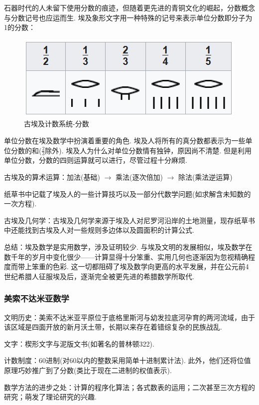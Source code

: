 \documentclass{Math_Note}
\begin{document}
石器时代的人未留下使用分数的痕迹，但随着更先进的青铜文化的崛起，分数概念与分数记号也应运而生.
埃及象形文字用一种特殊的记号来表示单位分数即分子为1的分数：

\begin{figure}[H]
    \centering
    \includegraphics[scale=0.8]{"./Figures/Ancient_Egyptian_Math_2.png"}
    \caption{古埃及计数系统-分数}
\end{figure}

单位分数在埃及数学中扮演着重要的角色. 埃及人将所有的真分数都表示为一些单位分数的和($\frac{2}{3}$除外).
埃及人为什么对单位分数情有独钟，原因尚不清楚. 但是利用单位分数，分数的四则运算就可以进行，尽管过程十分麻烦.

古埃及的算术运算：加法(基础) $\rightarrow$ 乘法(逐次倍加) $\rightarrow$ 除法(乘法逆运算)

纸草书中记载了埃及人的一些计算技巧以及一部分代数学问题(如求解含未知数的一次方程).

古埃及几何学：古埃及几何学来源于埃及人对尼罗河沿岸的土地测量，现存纸草书中还能找到古埃及人对一些规则多边体以及圆面积的计算公式.

总结：埃及数学是实用数学，涉及证明较少. 与埃及文明的发展相似，埃及数学在数千年的岁月中变化很少——计算显得十分笨重、实用几何也逐渐因为忽视精确程度而带上笨重的色彩.
这一切都阻碍了埃及数学向更高的水平发展，并在公元前4世纪希腊人征服埃及后，逐渐完全被更先进的希腊数学所取代.

\subsubsection{美索不达米亚数学}
文明历史：美索不达米亚平原位于底格里斯河与幼发拉底河孕育的两河流域，由于该区域是四面开放的新月沃土带，长期以来存在着错综复杂的民族战乱.

文字：楔形文字与泥版文书(如著名的普林顿322).

计数制度：60进制(对60以内的整数采用简单十进制累计法). 此外，他们还将位值原理巧妙推广到了分数(类比于现在二进制的权值表示). 

数学方法的进步之处：计算的程序化算法；各式数表的运用；二次甚至三次方程的研究；萌发了理论研究的兴趣.
\end{document}
